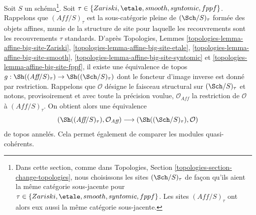 \noindent
Soit $S$ un schéma\footnote{Dans cette section, comme dans Topologies,
Section \ref{topologies-section-change-topologies}, nous choisissons les sites
$(\Sch/S)_\tau$ de façon qu'ils aient la même catégorie sous-jacente pour
$\tau \in \{Zariski, \etale, smooth, syntomic, fppf\}$. Les sites
$(\textit{Aff}/S)_\tau$ ont alors eux aussi la même catégorie sous-jacente.}.
Soit $\tau \in \{Zariski, \etale, smooth, syntomic, fppf\}$.
Rappelons que $(\textit{Aff}/S)_\tau$ est la sous-catégorie pleine de
$(\Sch/S)_\tau$ formée des objets affines, munie de la structure de site
pour laquelle les recouvrements sont les recouvrements $\tau$ standards.
D'après Topologies, Lemmes
\ref{topologies-lemma-affine-big-site-Zariski},
\ref{topologies-lemma-affine-big-site-etale},
\ref{topologies-lemma-affine-big-site-smooth},
\ref{topologies-lemma-affine-big-site-syntomic} et
\ref{topologies-lemma-affine-big-site-fppf}, il existe une équivalence de
topos
$g : \Sh((\textit{Aff}/S)_\tau) \to \Sh((\Sch/S)_\tau)$
dont le foncteur d'image inverse est donné par restriction.
Rappelons que $\mathcal{O}$ désigne le faisceau structural sur
$(\Sch/S)_\tau$ et notons, provisoirement et avec toute la précision voulue,
$\mathcal{O}_{\textit{Aff}}$ la restriction de $\mathcal{O}$ à
$(\textit{Aff}/S)_\tau$. On obtient alors une équivalence
\begin{equation}
\label{equation-alternative-ringed}
(\Sh((\textit{Aff}/S)_\tau), \mathcal{O}_{\textit{Aff}})
\longrightarrow
(\Sh((\Sch/S)_\tau), \mathcal{O})
\end{equation}
de topos annelés. Cela permet également de comparer les modules
quasi-cohérents.

